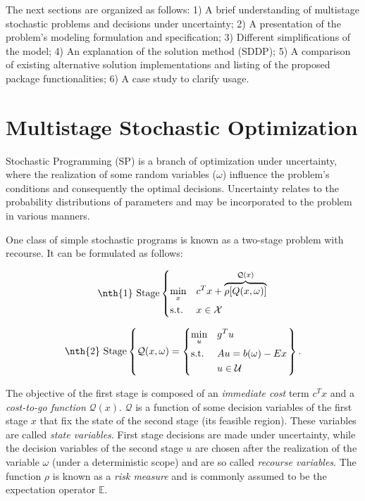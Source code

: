 \documentclass{juliacon}
\begin{document}
The next sections are organized as follows: 1) A brief understanding of multistage stochastic problems and decisions under uncertainty; 2) A presentation of the problem's modeling formulation and specification; 3) Different simplifications of the model; 4) An explanation of the solution method (SDDP); 5) A comparison of existing alternative solution implementations and listing of the proposed package functionalities; 6) A case study to clarify usage.

\section{Multistage Stochastic Optimization}
\label{sec:multistochopt}

Stochastic Programming (SP) \cite{shapiro2009lectures} is a branch of optimization under uncertainty, where the realization of some random variables ($\omega$) influence the problem's conditions and consequently the optimal decisions. Uncertainty relates to the probability distributions of parameters and may be incorporated to the problem in various manners. 

One class of simple stochastic programs is known as a two-stage problem with recourse. It can be formulated as follows:

\begin{equation*}
\nth{1} \text{ Stage} \left\{
\begin{aligned}
& \underset{x}{\text{min}}
& & c^T x + \overbrace{\rho[Q(x, \omega)]}^{\mathcal{Q}(x)} \\
& \text{s.t.}
& & x \in \mathcal{X}
\end{aligned}
\right.
\end{equation*}

\begin{equation*}
\nth{2} \text{ Stage} \left\{
\mathcal{Q}(x, \omega) = \left\{
\begin{aligned}
& \underset{u}{\text{min}}
& & g^T u \\
& \text{s.t.}
& & A u = b(\omega)- E x \\
& & & u \in \mathcal{U} 
\end{aligned}
\right. \right\}.
\end{equation*}

The objective of the first stage is composed of an \textit{immediate cost} term $c^T x$ and a \textit{cost-to-go function} $\mathcal{Q}(x)$. $\mathcal{Q}$ is a function of some decision variables of the first stage $x$ that fix the state of the second stage (its feasible region). These variables are called \textit{state variables}. First stage decisions are made under uncertainty, while the decision variables of the second stage $u$ are chosen after the realization of the variable $\omega$ (under a deterministic scope) and are so called \textit{recourse variables}. The function $\rho$ is known as a \textit{risk measure} \cite{artzner1999coherent} and is commonly assumed to be the expectation operator $\mathbb{E}$.
\end{document}
